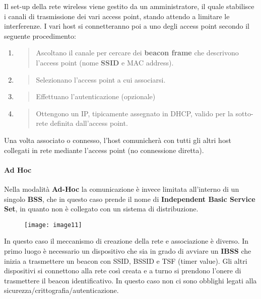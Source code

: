Il set-up della rete wireless viene gestito da un amministratore, il
quale stabilisce i canali di trasmissione dei vari access point, stando
attendo a limitare le interferenze. I vari host si connetteranno poi a
uno degli access point secondo il seguente procedimento:

\begin{enumerate}
\def\labelenumi{\arabic{enumi}.}
\item
  \begin{quote}
  Ascoltano il canale per cercare dei \textbf{beacon frame} che
  descrivono l'access point (nome \textbf{SSID} e MAC address).
  \end{quote}
\item
  \begin{quote}
  Selezionano l'access point a cui associarsi.
  \end{quote}
\item
  \begin{quote}
  Effettuano l'autenticazione (opzionale)
  \end{quote}
\item
  \begin{quote}
  Ottengono un IP, tipicamente assegnato in DHCP, valido per la
  sotto-rete definita dall'access point.
  \end{quote}
\end{enumerate}

Una volta associato o connesso, l'host comunicherà con tutti gli altri
host collegati in rete mediante l'access point (no connessione diretta).

\paragraph{Ad Hoc}\label{ad-hoc}

Nella modalità \textbf{Ad-Hoc} la comunicazione è invece limitata
all'interno di un singolo \textbf{BSS}, che in questo caso prende il
nome di \textbf{Independent Basic Service Set}, in quanto non è
collegato con un sistema di distribuzione.

\begin{figure}[H]
  \centering
  \texttt{[image: image11]}
\end{figure}

In questo caso il meccanismo di creazione della rete e associazione è
diverso. In primo luogo è necessario un dispositivo che sia in grado di
avviare un \textbf{IBSS} che inizia a trasmettere un beacon con SSID,
BSSID e TSF (timer value). Gli altri dispositivi si connettono alla rete
così creata e a turno si prendono l'onere di trasmettere il beacon
identificativo. In questo caso non ci sono obblighi legati alla
sicurezza/crittografia/autenticazione.

